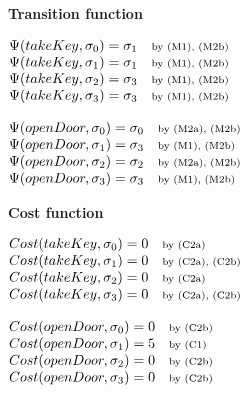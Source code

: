 \documentclass[11pt]{article}
\makeatletter
\newcommand{\exampleblocktitle}[1]{\par\medskip\noindent\textbf{#1}\par\smallskip}
\newcommand{\byrule}[1]{\quad \text{\scriptsize by #1}}
\newenvironment{statementblock}
{\begin{flushleft}\renewcommand{\arraystretch}{1.1}\(\begin{array}{@{}l@{}}}
{\end{array}\)\end{flushleft}}
\makeatother
\begin{document}
\exampleblocktitle{Transition function}
\noindent
\begin{minipage}[t]{0.47\textwidth}
\begin{statementblock}
\Psi(takeKey, \sigma_0) = \sigma_1 \byrule{(M1), (M2b)} \\
\Psi(takeKey, \sigma_1) = \sigma_1 \byrule{(M1), (M2b)} \\
\Psi(takeKey, \sigma_2) = \sigma_3 \byrule{(M1), (M2b)} \\
\Psi(takeKey, \sigma_3) = \sigma_3 \byrule{(M1), (M2b)}
\end{statementblock}
\end{minipage}
\hfill
\begin{minipage}[t]{0.47\textwidth}
\begin{statementblock}
\Psi(openDoor, \sigma_0) = \sigma_0 \byrule{(M2a), (M2b)} \\
\Psi(openDoor, \sigma_1) = \sigma_3 \byrule{(M1), (M2b)} \\
\Psi(openDoor, \sigma_2) = \sigma_2 \byrule{(M2a), (M2b)} \\
\Psi(openDoor, \sigma_3) = \sigma_3 \byrule{(M1), (M2b)}
\end{statementblock}
\end{minipage}

\exampleblocktitle{Cost function}
\noindent
\begin{minipage}[t]{0.47\textwidth}
\begin{statementblock}
Cost(takeKey, \sigma_0) = 0 \byrule{(C2a)} \\
Cost(takeKey, \sigma_1) = 0 \byrule{(C2a), (C2b)} \\
Cost(takeKey, \sigma_2) = 0 \byrule{(C2a)} \\
Cost(takeKey, \sigma_3) = 0 \byrule{(C2a), (C2b)}
\end{statementblock}
\end{minipage}
\hfill
\begin{minipage}[t]{0.47\textwidth}
\begin{statementblock}
Cost(openDoor, \sigma_0) = 0 \byrule{(C2b)} \\
Cost(openDoor, \sigma_1) = 5 \byrule{(C1)} \\
Cost(openDoor, \sigma_2) = 0 \byrule{(C2b)} \\
Cost(openDoor, \sigma_3) = 0 \byrule{(C2b)}
\end{statementblock}
\end{minipage}
\end{document}
